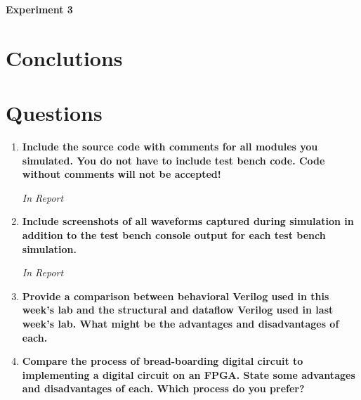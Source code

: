 \documentclass[a4paper,12pt]{article}
\begin{document}
%
%
%
%

\hspace{-15pt}\textbf{Experiment 3}


\section*{Conclutions}


\section*{Questions}

\begin{enumerate}
  \item \textbf{Include the source code with comments for all modules you simulated. You do not have to include test bench code. Code without comments will not be accepted!}

  \textit{In Report}

  \item \textbf{Include screenshots of all waveforms captured during simulation in addition to the test bench console output for each test bench simulation.}

  \textit{In Report}

  \item \textbf{Provide a comparison between behavioral Verilog used in this week’s lab and the structural and dataflow Verilog used in last week’s lab. What might be the advantages and disadvantages of each.}

  \item \textbf{Compare the process of bread-boarding digital circuit to implementing a digital circuit on an FPGA. State some advantages and disadvantages of each. Which process do you prefer?}
\end{enumerate}
\end{document}
